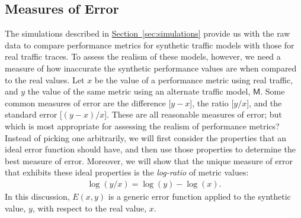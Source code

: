 \documentclass[conference]{IEEEtran}
\newcommand{\Section}[1]{\hyperref[sec:#1]{Section~\ref*{sec:#1}}}
\newcommand{\M}{\mathsf{M}}
\begin{document}
\subsection{Measures of Error}\label{sec:error-measures}

The simulations described in \Section{simulations} provide us with the raw data to compare performance metrics for synthetic traffic models with those for real traffic traces. To assess the realism of these models, however, we need a measure of how inaccurate the synthetic performance values are when compared to the real values. Let $x$ be the value of a performance metric using real traffic, and $y$ the value of the same metric using an alternate traffic model, $\M$. Some common measures of error are the difference [$y-x$], the ratio [$y/x$], and the standard error [$(y-x)/x$]. These are all reasonable measures of error; but which is most appropriate for assessing the realism of performance metrics? Instead of picking one arbitrarily, we will first consider the properties that an ideal error function should have, and then use those properties to determine the best measure of error. Moreover, we will show that the unique measure of error that exhibits these ideal properties is the  \textit{log-ratio} of metric values:
\begin{align}
\log(y/x)=\log(y)-\log(x).
\end{align}
In this discussion, $E(x,y)$ is a generic error function applied to the synthetic value, $y$, with respect to the real value, $x$.
\end{document}
